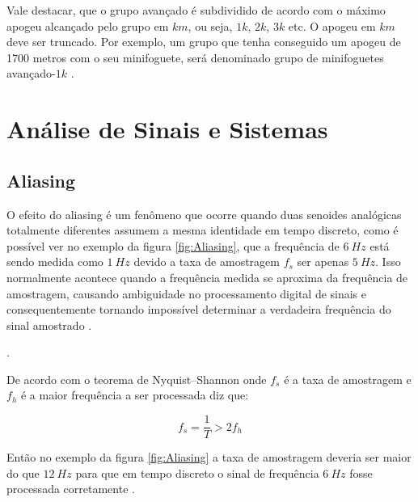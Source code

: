  Vale destacar, que o grupo avançado é subdividido de acordo com o máximo apogeu alcançado pelo grupo em $km$, ou seja, $1k$, $2k$, $3k$ etc. O apogeu em $km$ deve ser truncado. Por exemplo, um grupo que tenha conseguido um apogeu de 1700 metros com o seu minifoguete, será denominado grupo de minifoguetes avançado-$1k$ \cite{normas-foguete}.














\newpage
\section{Análise de Sinais e Sistemas}




\subsection{Aliasing}\label{subsec:Aliasing}


O efeito do aliasing é um fenômeno que ocorre quando duas senoides analógicas totalmente diferentes assumem a mesma identidade em tempo discreto,
como é possível ver no exemplo da figura \ref{fig:Aliasing}, que a frequência de $6\ Hz$ está sendo medida como $1\ Hz $ devido a taxa de amostragem  $f_s$ ser apenas $5\ Hz$. Isso normalmente acontece quando a frequência medida se aproxima da frequência de amostragem, causando ambiguidade no processamento digital de sinais  e consequentemente tornando impossível determinar a verdadeira frequência do sinal amostrado \cite{Lathi2018}.


 .

De acordo com o teorema de Nyquist–Shannon onde  $f_s$ é a taxa de amostragem e $f_h$ é a maior frequência a ser processada diz que:


\begin{equation}
    f_s=\frac{1}{T} >2f_h
\end{equation}


Então no exemplo da figura \ref{fig:Aliasing} a taxa de amostragem deveria ser maior do que $12\ Hz$ para que em tempo discreto o sinal de  frequência $6\ Hz$ fosse processada corretamente \cite{Lathi2018}. 






